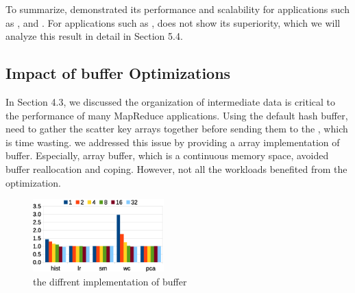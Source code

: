 





To summarize, \myds demonstrated its performance and scalability for applications such as ,  and .
For applications such as , \myds does not show its superiority, which we will analyze this result in detail in Section 5.4.

\subsection{ Impact of buffer Optimizations}
In Section 4.3, we discussed the organization of intermediate data is critical to the performance of many MapReduce applications.
Using the default hash buffer, need to gather the scatter key arrays together before sending them to the , which is time wasting.
we addressed this issue by providing a array implementation of buffer. 
Especially, array buffer, which is a continuous memory space, avoided buffer reallocation and coping.
However, not all the workloads benefited from the optimization.




\begin{figure}[!h!t]  
	\centering
	\includegraphics[width=0.45\textwidth]{eps/smr_diff_buffer.eps}
	\caption{the diffrent implementation of buffer}
	\label{fig:smr:diff:buffer}
\end{figure}

